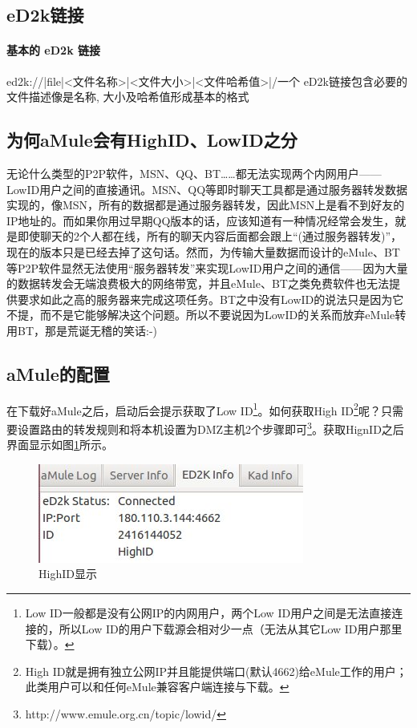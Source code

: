 \documentclass[paper=a4,fontsize=11pt]{article}
\begin{document}
	\subsection{eD2k链接}

	\paragraph{基本的 eD2k 链接}
	ed2k://|file|<文件名称>|<文件大小>|<文件哈希值>|/一个 eD2k链接包含必要的文件描述像是名称, 大小及哈希值形成基本的格式
	
	\subsection{为何aMule会有HighID、LowID之分}
	
	无论什么类型的P2P软件，MSN、QQ、BT……都无法实现两个内网用户——LowID用户之间的直接通讯。MSN、QQ等即时聊天工具都是通过服务器转发数据实现的，像MSN，所有的数据都是通过服务器转发，因此MSN上是看不到好友的IP地址的。而如果你用过早期QQ版本的话，应该知道有一种情况经常会发生，就是即使聊天的2个人都在线，所有的聊天内容后面都会跟上“(通过服务器转发)”，现在的版本只是已经去掉了这句话。然而，为传输大量数据而设计的eMule、BT等P2P软件显然无法使用“服务器转发”来实现LowID用户之间的通信——因为大量的数据转发会无端浪费极大的网络带宽，并且eMule、BT之类免费软件也无法提供要求如此之高的服务器来完成这项任务。BT之中没有LowID的说法只是因为它不提，而不是它能够解决这个问题。所以不要说因为LowID的关系而放弃eMule转用BT，那是荒诞无稽的笑话:-)
		
	\subsection{aMule的配置}
	在下载好aMule之后，启动后会提示获取了Low ID\footnote{Low ID一般都是没有公网IP的内网用户，两个Low ID用户之间是无法直接连接的，所以Low ID的用户下载源会相对少一点（无法从其它Low ID用户那里下载）。}。如何获取High ID\footnote{High ID就是拥有独立公网IP并且能提供端口(默认4662)给eMule工作的用户；此类用户可以和任何eMule兼容客户端连接与下载。}呢？只需要设置路由的转发规则和将本机设置为DMZ主机2个步骤即可\footnote{http://www.emule.org.cn/topic/lowid/}。获取HignID之后界面显示如图\ref{GetHighID}所示。
	
	\begin{figure}[htbp]
		\centering
		\includegraphics[scale=0.8]{GetHighID.jpeg}
		\caption{HighID显示}
		\label{GetHighID}
	\end{figure}
	
\end{document}
